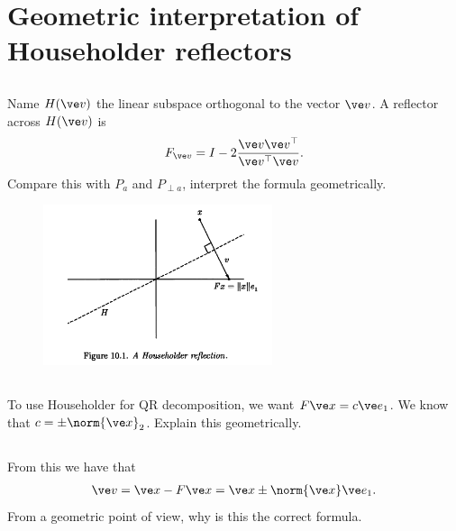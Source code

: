 \documentclass[11pt,letterpaper]{article}
\begin{document}
\newpage
\section{Geometric interpretation of Householder reflectors}
\subsection{}
Name $H(\ve v)$ the linear subspace orthogonal to the vector $\ve v$. A reflector across $H(\ve v)$ is 
\begin{align*}
    F_{\ve v} = I - 2 \frac{\ve v \ve v^\top}{\ve v^\top \ve v}.
\end{align*}
Compare this with $P_a$ and $P_{\perp a}$, interpret the formula geometrically.

\begin{figure}[H]
    \centering
    \includegraphics[width = 0.6\textwidth]{figs/TB_HouseholderRef}
\end{figure}

\subsection{}
To use Householder for QR decomposition, we want $F\ve x = c\ve e_1$. We know that $c = \pm\norm{\ve x}_2$. Explain this geometrically.

\subsection{}
From this we have that
\begin{align*}
    \ve v = \ve x- F\ve x =  \ve x \pm \norm{\ve x}\ve e_1.
\end{align*}
From a geometric point of view, why is this the correct formula.





\vfill


\end{document}

